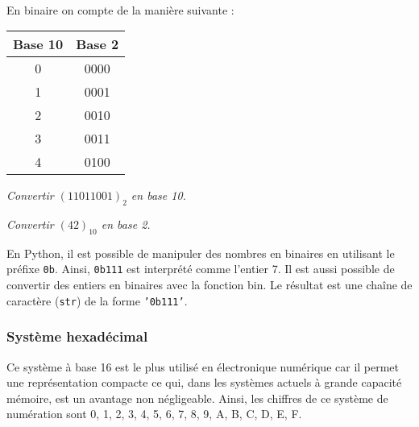\begin{exemple}~\\

\begin{minipage}[c]{.4\linewidth}
En binaire on compte de la manière suivante : 
\begin{center}
\begin{tabular}{|c|c|}
\hline
Base 10 & Base 2 \\
\hline \hline
0 & 0000 \\ \hline
1 & 0001 \\ \hline
2 & 0010 \\ \hline
3 & 0011 \\ \hline
4 & 0100 \\ \hline
\end{tabular}
\end{center}
\end{minipage} \hfill
\begin{minipage}{.57\linewidth}
\textit{Convertir $\left(11011001\right)_2$ en base 10.}

\textit{Convertir $\left(42\right)_{10}$ en base 2.}
\end{minipage}
\end{exemple}

En Python, il est possible de manipuler des nombres en binaires en utilisant le préfixe \texttt{0b}. Ainsi, \texttt{0b111} est interprété comme l'entier 7. 
Il est aussi possible de convertir des entiers en binaires avec la fonction bin. Le résultat est une chaîne de caractère (\texttt{str}) de la forme \texttt{'0b111'}.

\subsubsection{Système hexadécimal}
Ce système à base 16 est le plus utilisé en électronique numérique car il permet une représentation compacte ce qui, dans les systèmes actuels à grande capacité mémoire, est un avantage non négligeable. 
Ainsi, les chiffres de ce système de numération sont 0, 1, 2, 3, 4, 5, 6, 7, 8, 9, A, B, C, D, E, F.  

